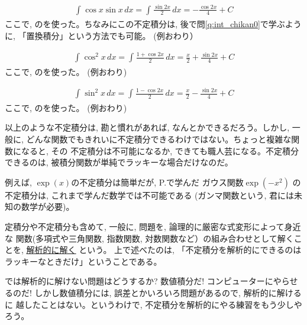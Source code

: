 \begin{exmpl}\label{ex:intsinxcosx}
\begin{eqnarray*}
\int_{}^{} \cos x \sin x\,dx=\int_{}^{} \frac{\sin 2x}{2}\, dx=-\frac{\cos 2x}{4}+C
\end{eqnarray*}
ここで, のを使った。ちなみにこの不定積分は, 
後で問\ref{q:int_chikan0}で学ぶように, 「置換積分」という方法でも可能。 (例おわり）\end{exmpl}
\vspace{0.1cm}

\begin{exmpl}
\begin{eqnarray*}
\int_{}^{} \cos^2 x \,dx=\int_{}^{} \frac{1+\cos 2x}{2}\, dx=\frac{x}{2}+\frac{\sin 2x}{4}+C
\end{eqnarray*}
ここで, のを使った。
(例おわり)\end{exmpl}
\vspace{0.1cm}

\begin{exmpl}
\begin{eqnarray*}
\int_{}^{} \sin^2 x \,dx=\int_{}^{} \frac{1-\cos 2x}{2}\, dx=\frac{x}{2}-\frac{\sin 2x}{4}+C
\end{eqnarray*}
ここで, のを使った。
(例おわり)\end{exmpl}

以上のような不定積分は, 勘と慣れがあれば, なんとかできるだろう。しかし, 一般に, 
どんな関数でもきれいに不定積分できるわけではない。ちょっと複雑な関数になると, その
不定積分は不可能になるか, できても職人芸になる。不定積分できるのは, 
被積分関数が単純でラッキーな場合だけなのだ。

例えば, $\exp(x)$の不定積分は簡単だが, P.\pageref{eq:Gauss_func}で学んだ
ガウス関数$\exp(-x^2)$
の不定積分は, これまで学んだ数学では不可能である (ガンマ関数という, 
君には未知の数学が必要)。

定積分や不定積分も含めて, 一般に, 問題を, 論理的に厳密な式変形によって身近な
関数(多項式や三角関数, 指数関数, 対数関数など）の組み合わせとして解くことを, 
\underline{解析的に解く} という。
上で述べたのは, 「不定積分を解析的にできるのはラッキーなときだけ」ということである。

では解析的に解けない問題はどうするか? 数値積分だ! コンピューターにやらせるのだ!
しかし数値積分には, 誤差とかいろいろ問題があるので, 解析的に解けるに
越したことはない。というわけで, 不定積分を解析的にやる練習をもう少しやろう。
\vv



